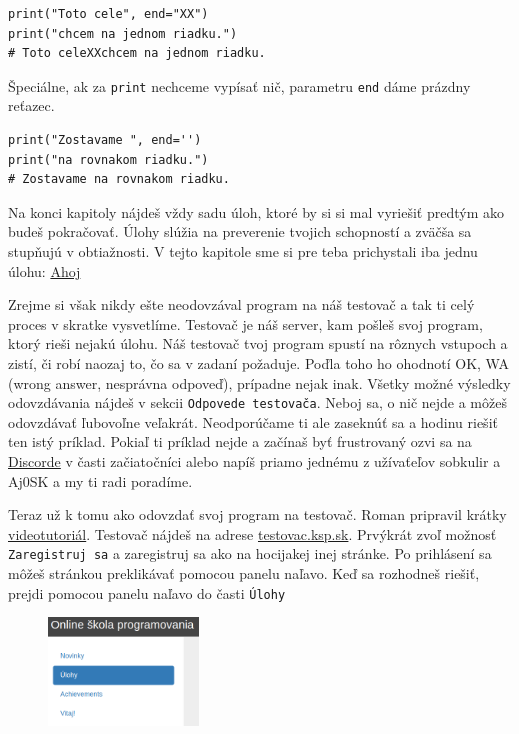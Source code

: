 \documentclass{article}
\begin{document}
\begin{lstlisting}
print("Toto cele", end="XX")
print("chcem na jednom riadku.")
# Toto celeXXchcem na jednom riadku.
\end{lstlisting}

Špeciálne, ak za \texttt{print} nechceme vypísať nič, parametru \texttt{end} dáme prázdny reťazec.
\begin{lstlisting}
print("Zostavame ", end='')
print("na rovnakom riadku.")
# Zostavame na rovnakom riadku.
\end{lstlisting}


Na konci kapitoly nájdeš vždy sadu úloh, ktoré by si si mal vyriešiť predtým ako budeš pokračovať. Úlohy slúžia na preverenie tvojich schopností a zväčša sa stupňujú v obtiažnosti. V tejto kapitole sme si pre teba prichystali iba jednu úlohu: \href{https://testovac.ksp.sk/tasks/ls-uvod-ahoj/}{Ahoj}

Zrejme si však nikdy ešte neodovzával program na náš testovač a tak ti celý proces v skratke vysvetlíme. Testovač je náš server, kam pošleš svoj program, ktorý rieši nejakú úlohu. Náš testovač tvoj program spustí na rôznych vstupoch a zistí, či robí naozaj to, čo sa v zadaní požaduje. Poďla toho ho ohodnotí OK, WA (wrong answer, nesprávna odpoveď), prípadne nejak inak. Všetky možné výsledky odovzdávania nájdeš v sekcii \texttt{Odpovede testovača}. Neboj sa, o nič nejde a môžeš odovzdávať ľubovoľne veľakrát. Neodporúčame ti ale zaseknúť sa a hodinu riešiť ten istý príklad. Pokiaľ ti príklad nejde a začínaš byť frustrovaný ozvi sa na \href{https://discord.gg/QKgNmW9}{Discorde} v časti začiatočníci alebo napíš priamo jednému z užívaťeľov sobkulir a Aj0SK a my ti radi poradíme.

Teraz už k tomu ako odovzdať svoj program na testovač. Roman pripravil krátky \href{https://www.youtube.com/watch?v=RV5uoLwQDsg}{videotutoriál}. Testovač nájdeš na adrese \href{https://testovac.ksp.sk/}{testovac.ksp.sk}. Prvýkrát zvoľ možnosť \texttt{Zaregistruj sa} a zaregistruj sa ako na hocijakej inej stránke. Po prihlásení sa môžeš stránkou preklikávať pomocou panelu naľavo. Keď sa rozhodneš riešiť, prejdi pomocou panelu naľavo do časti \texttt{Úlohy}

\begin{figure}[h]
\includegraphics[width=4cm]{lavypanel}
\centering
\end{figure}
\end{document}
